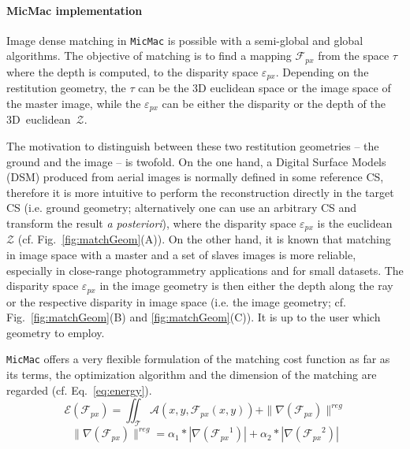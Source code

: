\documentclass[twocolumn]{bmcart}%
\newcommand{\Energ}{\ensuremath{{\mathcal E}}}
\newcommand{\Ress}{\ensuremath{{\mathcal A}}}
\newcommand{\FPx}{\ensuremath{{\mathcal F}_{px}}}
\newcommand{\ETer}{\ensuremath {\mathcal T}}
\begin{document}
\paragraph*{MicMac implementation}
%
Image dense matching in {\tt MicMac} is possible with a semi-global and global algorithms. The objective of matching is to find a mapping $\mathcal{F}_{px}$ from the space $\tau$ where the depth is computed, to the disparity space $\varepsilon_{px}$. Depending on the restitution geometry, the $\tau$ can be the 3D euclidean space or the image space of the master image, while the $\varepsilon_{px}$ can be either the disparity or the depth of the 3D~euclidean~$\mathcal{Z}$.\par  
%
The motivation to distinguish between these two restitution geometries -- the ground and the image -- is twofold. On the one hand, a Digital Surface Models (DSM) produced from aerial images is normally defined in some reference CS, therefore it is more intuitive to perform the reconstruction directly in the target CS (i.e. ground geometry; alternatively one can use an arbitrary CS and transform the result \textit{a posteriori}), where the disparity space $\varepsilon_{px}$ is the euclidean $\mathcal{Z}$ (cf. Fig.~\ref{fig:matchGeom}(A)). 
On the other hand, it is known that matching in image space with a master and a set of slaves images is more reliable, especially in close-range photogrammetry applications and for small datasets. The disparity space $\varepsilon_{px}$ in the image geometry is then either the depth along the ray or the respective disparity in image space (i.e. the image geometry; cf. Fig.~\ref{fig:matchGeom}(B) and \ref{fig:matchGeom}(C)). It is up to the user which geometry to employ.
\par
%
{\tt MicMac} offers a very flexible formulation of the matching cost function as far as its terms, the optimization algorithm and the dimension of the matching are regarded (cf. Eq.~\ref{eq:energy}).   
\begin{equation}
\label{eq:energy}
   \Energ(\FPx) = \iint_\ETer \Ress(x,y,\FPx(x,y)) + \| \nabla(\FPx) \|^{reg}
\end{equation}
\begin{equation}
\label{eq:energySmoothTerm}
   \| \nabla(\FPx) \|^{reg} = \alpha_1*|\nabla(\FPx^1)|+\alpha_2*|\nabla(\FPx^2)|
\end{equation}
\end{document}
